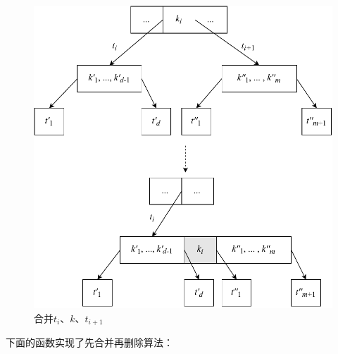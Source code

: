 \documentclass[b5paper]{ctexart}
\begin{document}
\begin{figure}[htbp]
  \centering
  \includegraphics[scale=0.65]{img/btree-del-merge-subtree}
  \caption{合并$t_i$、$k$、$t_{i+1}$}
  \label{fig:btree-del-merge-subtree}
\end{figure}

下面的函数实现了先合并再删除算法：
\end{document}
